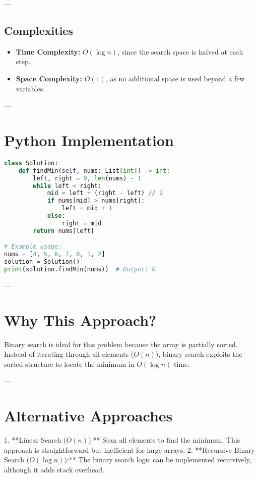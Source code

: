 ---

\subsection*{Complexities}
\begin{itemize}
    \item \textbf{Time Complexity:} \( O(\log n) \), since the search space is halved at each step.
    \item \textbf{Space Complexity:} \( O(1) \), as no additional space is used beyond a few variables.
\end{itemize}

---

\section*{Python Implementation}

\begin{fullwidth}
\begin{lstlisting}[language=Python]
class Solution:
    def findMin(self, nums: List[int]) -> int:
        left, right = 0, len(nums) - 1
        while left < right:
            mid = left + (right - left) // 2
            if nums[mid] > nums[right]:
                left = mid + 1
            else:
                right = mid
        return nums[left]

# Example usage:
nums = [4, 5, 6, 7, 0, 1, 2]
solution = Solution()
print(solution.findMin(nums))  # Output: 0
\end{lstlisting}
\end{fullwidth}

---

\section*{Why This Approach?}
Binary search is ideal for this problem because the array is partially sorted. Instead of iterating through all elements (\(O(n)\)), binary search exploits the sorted structure to locate the minimum in \(O(\log n)\) time.

---

\section*{Alternative Approaches}
1. **Linear Search (\(O(n)\)):** Scan all elements to find the minimum. This approach is straightforward but inefficient for large arrays.
2. **Recursive Binary Search (\(O(\log n)\)):** The binary search logic can be implemented recursively, although it adds stack overhead.

